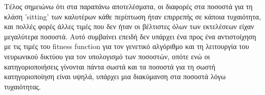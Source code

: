 \documentclass[12pt,a4paper]{article}
\begin{document}
Τέλος σημειώνω ότι στα παραπάνω αποτελέσματα, οι διαφορές στα ποσοστά για τη κλάση 'sitting' των καλυτέρων κάθε περίπτωση ήταν επιρρεπής σε κάποια τυχαιότητα, και πολλές φορές άλλες τιμές που δεν ήταν οι βέλτιστες όλων των εκτελέσεων είχαν μεγαλύτερα ποσοστά. Αυτό συμβαίνει επειδή δεν υπάρχει ένα προς ένα αντιστοίχηση με τις τιμές του fitness function για τον γενετικό αλγόριθμο και τη λειτουργία του νευρωνικού δικτύου για τον υπολογισμό των ποσοστών, οπότε ενώ οι κατηγοριοποιήσεις γίνονται πάντα σωστά και τα ποσοστά για τη σωστή κατηγοριοποίηση είναι υψηλά, υπάρχει μια διακύμανση στα ποσοστά λόγω τυχαιότητας.
\end{document}

